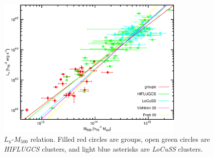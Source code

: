 \documentclass[structabstract]{aa}
\begin{document}
   \begin{figure}
   \centering
   \includegraphics[width=0.82\textwidth]{lmhda500_c.eps}
   \caption{$L_{\text{x}}$-$M_{500}$ relation. Filled red circles are
     groups, open green circles are \emph{HIFLUGCS} clusters, and light blue asterisks are \emph{LoCuSS} clusters.}
              \label{fig:lm500relation}%
    \end{figure}
\end{document}
